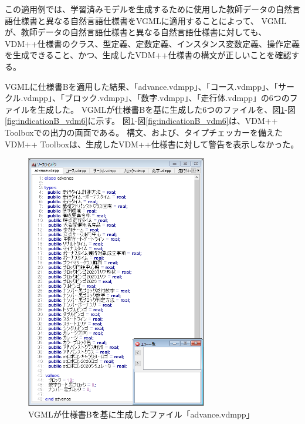 この適用例では、学習済みモデルを生成するために使用した教師データの自然言語仕様書と異なる自然言語仕様書をVGMLに適用することによって、
VGMLが、教師データの自然言語仕様書と異なる自然言語仕様書に対しても、
VDM++仕様書のクラス、型定義、定数定義、インスタンス変数定義、操作定義を生成できること、かつ、生成したVDM++仕様書の構文が正しいことを確認する。

VGMLに仕様書Bを適用した結果、「advance.vdmpp」、「コース.vdmpp」、「サークル.vdmpp」、「ブロック.vdmpp」、「数字.vdmpp」、「走行体.vdmpp」の6つのファイルを生成した。
VGMLが仕様書Bを基に生成した6つのファイルを、図\ref{fig:indicationB_vdm1}-図\ref{fig:indicationB_vdm6}に示す。
図\ref{fig:indicationB_vdm1}-図\ref{fig:indicationB_vdm6}は、VDM++ Toolbox\cite{Tools}での出力の画面である。
構文、および、タイプチェッカーを備えたVDM++ Toolboxは、生成したVDM++仕様書に対して警告を表示しなかった。

\begin{figure}[p]
    \begin{center}
    \includegraphics[width=300]{image/indicationB_vdm1.PNG}
    \caption{VGMLが仕様書Bを基に生成したファイル「advance.vdmpp」}
    \label{fig:indicationB_vdm1}
    \end{center}
\end{figure}

